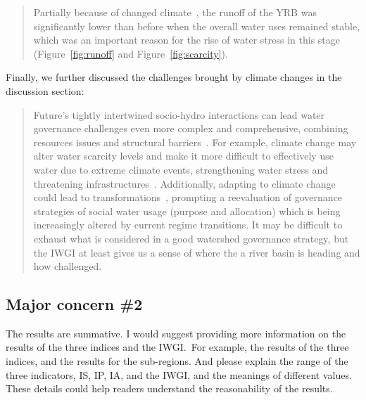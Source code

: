 \begin{quote}
	Partially because of changed climate~\cite{han2023,liu2020c}, the runoff of the YRB was significantly lower than before when the overall water uses remained stable, which was an important reason for the rise of water stress in this stage (Figure~\ref{fig:runoff} and Figure~\ref{fig:scarcity}).
\end{quote}

\AR*{} Finally, we further discussed the challenges brought by climate changes in the discussion section:

\begin{quote}
	Future's tightly intertwined socio-hydro interactions can lead water governance challenges even more complex and comprehensive, combining resources issues and structural barriers~\cite{huggins2022a}.
	For example, climate change may alter water scarcity levels and make it more difficult to effectively use water due to extreme climate events, strengthening water stress and threatening infrastructures~\cite{liu2017, dibaldassarre2019}.
	Additionally, adapting to climate change could lead to transformations~\cite{sachs2019,barnes2020}, prompting a reevaluation of governance strategies of social water usage (purpose and allocation) which is being increasingly altered by current regime transitions.
	It may be difficult to exhaust what is considered in a good watershed governance strategy, but the IWGI at least gives us a sense of where the a river basin is heading and how challenged.
\end{quote}

\subsection{Major concern \#2}
\RC{} The results are summative. I would suggest providing more information on the results of the three indices and the IWGI.\ For example, the results of the three indices, and the results for the sub-regions. And please explain the range of the three indicators, IS, IP, IA, and the IWGI, and the meanings of different values. These details could help readers understand the reasonability of the results.

